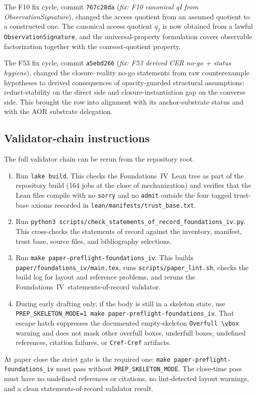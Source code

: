 \documentclass[11pt]{article}
\newcommand{\FIV}{Foundations~IV}
\theoremstyle{definition}
\begin{document}
The F10 fix cycle, commit \texttt{767c28da}
(\emph{fix: F10 canonical qI from ObservationSignature}), changed the
access quotient from an assumed quotient to a constructed one. The
canonical access quotient \(q_I\) is now obtained from a lawful
\texttt{ObservationSignature}, and the universal-property formulation
covers observable factorization together with the coarsest-quotient
property.

The F53 fix cycle, commit \texttt{a5ebd266}
(\emph{fix: F53 derived CER no-go + status hygiene}), changed the
closure--reality no-go statements from raw counterexample hypotheses to
derived consequences of opacity-guarded structural assumptions:
reduct-stability on the direct side and closure-instantiation gap on
the converse side. This brought the row into alignment with its
anchor-substrate status and with the AOR substrate delegation.

\subsection{Validator-chain instructions}\label{subsec:validator-chain-instructions}

The full validator chain can be rerun from the repository root.

\begin{enumerate}
\item Run \texttt{lake build}. This checks the \FIV\ Lean tree as part
of the repository build (164 jobs at the close of mechanization) and
verifies that the Lean files compile with no \texttt{sorry} and no
\texttt{admit} outside the four tagged trust-base axioms recorded in
\texttt{lean/manifests/trust\_base.txt}.
\item Run
\texttt{python3 scripts/check\_statements\_of\_record\_foundations\_iv.py}.
This cross-checks the statements of record against the inventory,
manifest, trust base, source files, and bibliography selections.
\item Run \texttt{make paper-preflight-foundations\_iv}. This builds
\texttt{paper/foundations\_iv/main.tex}, runs
\texttt{scripts/paper\_lint.sh}, checks the build log for layout and
reference problems, and reruns the \FIV\ statements-of-record validator.
\item During early drafting only, if the body is still in a skeleton
state, use
\texttt{PREP\_SKELETON\_MODE=1 make paper-preflight-foundations\_iv}.
That escape hatch suppresses the documented empty-skeleton
\texttt{Overfull \textbackslash vbox} warning and does not mask other
overfull boxes, underfull boxes, undefined references, citation
failures, or \texttt{Cref-Cref} artifacts.
\end{enumerate}

At paper close the strict gate is the required one:
\texttt{make paper-preflight-foundations\_iv} must pass without
\texttt{PREP\_SKELETON\_MODE}. The close-time pass must have no
undefined references or citations, no lint-detected layout warnings, and
a clean statements-of-record validator result.
 

\clearpage


\end{document}
